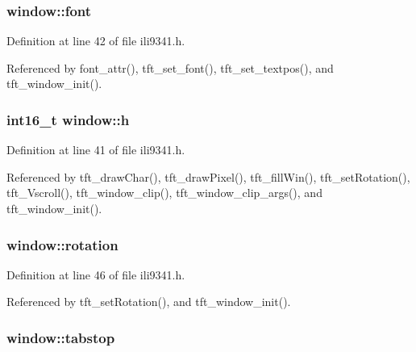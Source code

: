 \hypertarget{structwindow_acee24e56db43557a46cbb5ca3fe35021}{
\subsubsection[{font}]{ window\-::font}}\label{structwindow_acee24e56db43557a46cbb5ca3fe35021}


Definition at line 42 of file ili9341.\-h.



Referenced by font\-\_\-attr(), tft\-\_\-set\-\_\-font(), tft\-\_\-set\-\_\-textpos(), and tft\-\_\-window\-\_\-init().

\hypertarget{structwindow_a822391abd5d09e6ce7152f68cff3ef2b}{
\subsubsection[{h}]{\setlength{\rightskip}{0pt plus 5cm}int16\-\_\-t window\-::h}}\label{structwindow_a822391abd5d09e6ce7152f68cff3ef2b}


Definition at line 41 of file ili9341.\-h.



Referenced by tft\-\_\-draw\-Char(), tft\-\_\-draw\-Pixel(), tft\-\_\-fill\-Win(), tft\-\_\-set\-Rotation(), tft\-\_\-\-Vscroll(), tft\-\_\-window\-\_\-clip(), tft\-\_\-window\-\_\-clip\-\_\-args(), and tft\-\_\-window\-\_\-init().

\hypertarget{structwindow_afbd48ebcb41e68d0f458dac593578aa8}{
\subsubsection[{rotation}]{ window\-::rotation}}\label{structwindow_afbd48ebcb41e68d0f458dac593578aa8}


Definition at line 46 of file ili9341.\-h.



Referenced by tft\-\_\-set\-Rotation(), and tft\-\_\-window\-\_\-init().

\hypertarget{structwindow_a88d2836d45dd428d8fadfd703f0f965f}{
\subsubsection[{tabstop}]{ window\-::tabstop}}\label{structwindow_a88d2836d45dd428d8fadfd703f0f965f}


